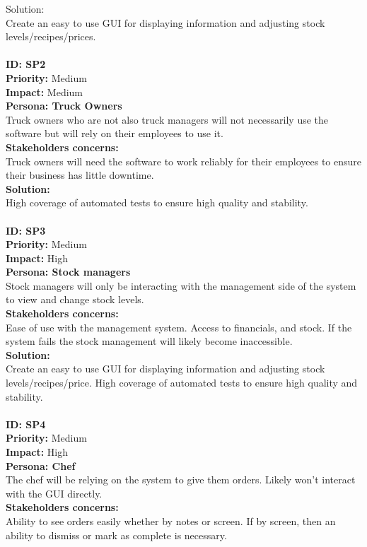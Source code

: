 Solution:\\
Create an easy to use GUI for displaying information and adjusting stock levels/recipes/prices.\\
\\
\textbf{ID: SP2\\}
\textbf{Priority:} Medium\\
\textbf{Impact:} Medium\\
\textbf{Persona: Truck Owners\\}
Truck owners who are not also truck managers will not necessarily use the software but will rely on their employees to use it.\\
\textbf{Stakeholders concerns:\\}
Truck owners will need the software to work  reliably for their employees to ensure their business has little downtime.\\
\textbf{Solution:}\\
High coverage of automated tests to ensure high quality and stability.\\
\\
\textbf{ID: SP3\\}
\textbf{Priority:} Medium\\
\textbf{Impact:} High\\
\textbf{Persona: Stock managers}\\
Stock managers will only be interacting with the management side of the system to view and change stock levels.\\
\textbf{Stakeholders concerns:\\}
Ease of use with the management system. Access to financials, and stock. If the system fails the stock management will likely become inaccessible.\\
\textbf{Solution:\\}
Create an easy to use GUI for displaying information and adjusting stock levels/recipes/price. High coverage of automated tests to ensure high quality and stability.\\
\\
\textbf{ID: SP4\\}
\textbf{Priority:} Medium\\
\textbf{Impact:} High\\
\textbf{Persona: Chef\\}
The chef will be relying on the system to give them orders. Likely won’t interact with the GUI directly.\\
\textbf{Stakeholders concerns:\\}
Ability to see orders easily whether by notes or screen. If by screen, then an ability to dismiss or mark as complete is necessary.\\
